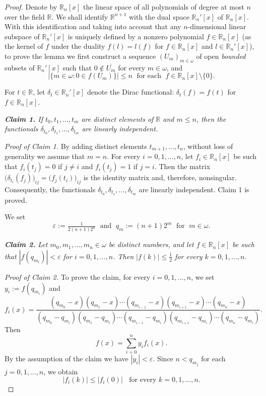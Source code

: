 \documentclass[preprint,11pt]{elsarticle}
\theoremstyle{definition}
\theoremstyle{remark}
\numberwithin{equation}{section}
\numberwithin{theorem}{section}
\newcommand{\e}{\varepsilon}
\newcommand{\w}{\omega}
\newcommand{\RR}{\mathbb{R}}
\newcommand{\IR}{\mathbb{R}}
\begin{document}
\begin{proof}
Denote by $\IR_n[x]$ the linear space of all polynomials of degree at most $n$ over the field $\IR$.
We shall identify $\IR^{n+1}$ with the dual space $\IR_n'[x]$ of $\IR_n[x]$. With this identification and taking into account that any $n$-dimensional linear subspace of $\IR_n'[x]$ is uniquely defined by a nonzero polynomial $f\in \IR_n[x]$ (as the kernel of $f$ under the duality $f(l)=l(f)$ for $f\in \IR_n[x]$ and $l\in \IR_n'[x]$), to prove the lemma we first construct a sequence $(U_m)_{m\in \w}$ of open {\em bounded} subsets of $\IR_n'[x]$ such that $0\not\in \overline{U_m}$ for every $m\in\w$, and
\begin{equation}\label{eq:lemRn+1}
|\{m\in\w: 0\in f(U_m) \}|\leq n \; \text{ for each }\; f\in \IR_n[x]\setminus \{0\}.
\end{equation}

For $t\in\IR$, let $\delta_t\in \IR_n'[x]$ denote the Dirac functional: $\delta_t(f)=f(t)$ for $f\in \RR_n[x]$.
\smallskip

{\em {\bf Claim 1.} If $t_0,t_1,...,t_m$ are distinct elements of $\IR$ and $m\leq n$, then the functionals $\delta_{t_0},\delta_{t_1},...,\delta_{t_m}$ are linearly independent.}
\smallskip

{\em Proof of Claim 1.} By adding distinct elements $t_{m+1},\dots,t_n$, without loss of generality we assume that $m=n$. For every $i=0,1,...,n$, let $f_i\in \IR_n[x]$ be such that $f_i(t_j)=0$ if $j\neq i$ and $f_i(t_j)=1$ if $j= i$. Then the matrix $\big(\delta_{t_i}(f_j)\big)_{ij}=\big(f_j(t_i)\big)_{ij}$ is the identity matrix and, therefore, nonsingular. Consequently, the functionals $\delta_{t_0},\delta_{t_1},...,\delta_{t_m}$ are linearly independent. Claim 1 is proved.
\smallskip

We set
\[
\e := \tfrac{1}{2(n+1)2^n} \; \text{ and } \; q_m := (n+1) 2^m \; \text{ for }\; m\in\w.
\]
\smallskip

{\em {\bf Claim 2.} Let $m_0,m_1,...,m_n\in\w$ be distinct numbers, and let $f\in \IR_n[x]$ be such that $|f(q_{m_i})|<\e$ for $i=0,1,...,n$.  Then $|f(k)|\leq \tfrac{1}{2}$ for every $k=0,1,...,n$.}
\smallskip

{\em Proof of Claim 2.} To prove the claim, for every $i=0,1,...,n$, we set $y_i:=f(q_{m_i})$ and
\[
f_i(x) =\frac
{(q_{m_0}-x)(q_{m_1}-x)\cdots(q_{m_{i-1}}-x)(q_{m_{i+1}}-x)\cdots(q_{m_{n}}-x)}
{(q_{m_0}-q_{m_i})(q_{m_1}-q_{m_i})\cdots(q_{m_{i-1}}-q_{m_i})(q_{m_{i+1}}-q_{m_i})\cdots(q_{m_{n}}-q_{m_i})}.
\]
%
Then
\[
f(x)=\sum_{i=0}^n y_i f_i(x).
\]
By the assumption of the claim we have $|y_i|<\e$. Since $n < q_{m_j}$ for each $j=0,1,...,n$, we obtain
\[
|f_i(k)|\leq |f_i(0)| \;\; \mbox{ for every $k=0,1,...,n$}.
\]



\end{proof}
\end{document}
